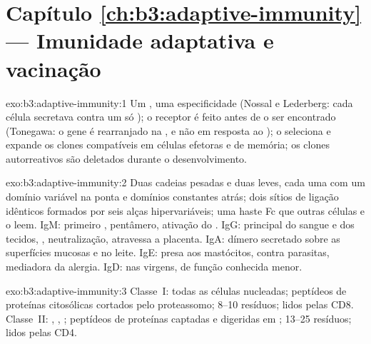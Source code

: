 \section*{Capítulo \ref{ch:b3:adaptive-immunity} --- Imunidade adaptativa e vacinação}

\begin{solution}{exo:b3:adaptive-immunity:1}
Um , uma especificidade (Nossal e Lederberg: cada célula
secretava  contra um só ); o receptor é feito antes de
o  ser encontrado (Tonegawa: o gene é rearranjado na ,
e não em resposta ao ); o  seleciona e expande os clones
compatíveis em células efetoras e de memória; os clones autorreativos
são deletados durante o desenvolvimento.
\end{solution}

\begin{solution}{exo:b3:adaptive-immunity:2}
Duas cadeias pesadas e duas leves, cada uma com um domínio variável na
ponta e domínios constantes atrás; dois sítios de ligação idênticos
formados por seis alças hipervariáveis; uma haste Fc que outras células
e o  leem. IgM: primeiro , pentâmero, ativação do
. IgG: principal  do sangue e dos tecidos,
, neutralização, atravessa a placenta. IgA: dímero secretado
sobre as superfícies mucosas e no leite. IgE: presa aos mastócitos,
contra parasitas, mediadora da alergia. IgD: nas  virgens, de
função conhecida menor.
\end{solution}

\begin{solution}{exo:b3:adaptive-immunity:3}
Classe~I: todas as células nucleadas; peptídeos de proteínas
citosólicas cortados pelo proteassomo; 8--10 resíduos; lidos pelas
 CD8. Classe~II: , ,
; peptídeos de proteínas captadas e digeridas em ;
13--25 resíduos; lidos pelas  CD4.
\end{solution}

